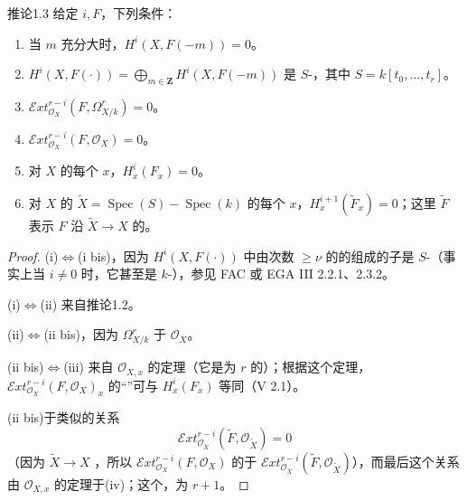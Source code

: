 \begin{SGAresult}{推论}{1.3}
给定 $i,F$，下列条件：
\begin{enumerate}
\item[(i)] 当 $m$ 充分大时，$H^i(X,F(-m))=0$。
\item[(i bis)] $H^i(X,F(\cdot))=\bigoplus_{m\in\mathbf Z}H^i(X,F(-m))$ 是 $S$-，其中 $S=k[t_0,\ldots,t_r]$。
\item[(ii)] $\mathcal Ext^{r-i}_{\mathcal O_X}(F,\Omega^r_{X/k})=0$。
\item[(ii bis)] $\mathcal Ext^{r-i}_{\mathcal O_X}(F,\mathcal O_X)=0$。
\item[(iii)] 对 $X$ 的每个 $x$，$H^i_x(F_x)=0$。
\item[(iv)] 对 $X$ 的 $\widetilde X=\operatorname{Spec}(S)-\operatorname{Spec}(k)$ 的每个 $x$，$H^{i+1}_x(\widetilde F_x)=0$；这里 $\widetilde F$ 表示 $F$ 沿 $\widetilde X\to X$ 的。
\end{enumerate}
\end{SGAresult}
\begin{proof}
(i)$\Leftrightarrow$(i bis)，因为 $H^i(X,F(\cdot))$ 中由次数 $\geq\nu$ 的的组成的子是 $S$-（事实上当 $i\neq0$ 时，它甚至是 $k$-），参见 FAC 或 EGA III 2.2.1、2.3.2。

(i)$\Leftrightarrow$(ii) 来自推论1.2。

(ii)$\Leftrightarrow$(ii bis)，因为 $\Omega^r_{X/k}$ 于 $\mathcal O_X$。

(ii bis)$\Leftrightarrow$(iii) 来自 $\mathcal O_{X,x}$ 的定理（它是为 $r$ 的）；根据这个定理，$\mathcal Ext^{r-i}_{\mathcal O_X}(F,\mathcal O_X)_x$ 的“”可与 $H^i_x(F_x)$ 等同（V 2.1）。

(ii bis)于类似的关系
\[
 \mathcal Ext^{r-i}_{\mathcal O_{\widetilde X}}(\widetilde F,\mathcal O_{\widetilde X})=0
\]
（因为 $\widetilde X\to X$ ，所以 $\mathcal Ext^{r-i}_{\mathcal O_X}(F,\mathcal O_X)$ 的于 $\mathcal Ext^{r-i}_{\mathcal O_{\widetilde X}}(\widetilde F,\mathcal O_{\widetilde X})$），而最后这个关系由 $\mathcal O_{X,x}$ 的定理于(iv)；这个，为 $r+1$。
\end{proof}
